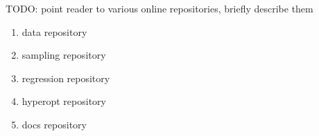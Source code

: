 TODO: point reader to various online repositories, briefly describe them

\begin{enumerate}
	\item data repository
	\item sampling repository
	\item regression repository
	\item hyperopt repository
	\item docs repository
\end{enumerate}

